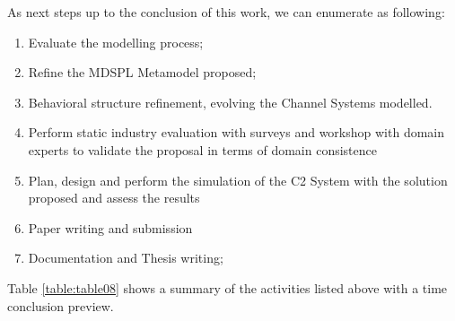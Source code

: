As next steps up to the conclusion of this work, we can enumerate as following:


\begin{enumerate}
\item Evaluate the modelling process;
\item Refine the MDSPL Metamodel proposed;
\item Behavioral structure refinement, evolving the Channel Systems modelled.
\item Perform static industry evaluation with surveys and workshop with domain experts to validate the proposal in terms of domain consistence
\item Plan, design and perform the simulation of the C2 System with the solution proposed and assess the results
\item Paper writing and submission
\item Documentation and Thesis writing;
\end{enumerate}

Table \ref{table:table08} shows a summary of the activities listed above with a time conclusion preview.




